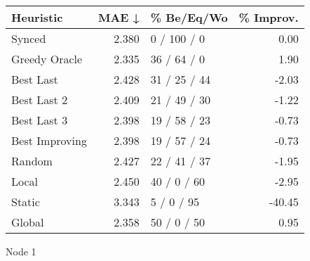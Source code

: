 \begin{tabular}{lrlr}
\toprule
\textbf{Heuristic} & \textbf{MAE ↓} & \textbf{\% Be/Eq/Wo} & \textbf{\% Improv.} \\
\midrule
            Synced &          2.380 &          0 / 100 / 0 &                0.00 \\
     Greedy Oracle &          2.335 &          36 / 64 / 0 &                1.90 \\
         Best Last &          2.428 &         31 / 25 / 44 &               -2.03 \\
       Best Last 2 &          2.409 &         21 / 49 / 30 &               -1.22 \\
       Best Last 3 &          2.398 &         19 / 58 / 23 &               -0.73 \\
    Best Improving &          2.398 &         19 / 57 / 24 &               -0.73 \\
            Random &          2.427 &         22 / 41 / 37 &               -1.95 \\
             Local &          2.450 &          40 / 0 / 60 &               -2.95 \\
            Static &          3.343 &           5 / 0 / 95 &              -40.45 \\
            Global &          2.358 &          50 / 0 / 50 &                0.95 \\
\bottomrule
\end{tabular}
\caption{Node 1}
\label{tab:hr_non_lr05_le1_bs4_1}
